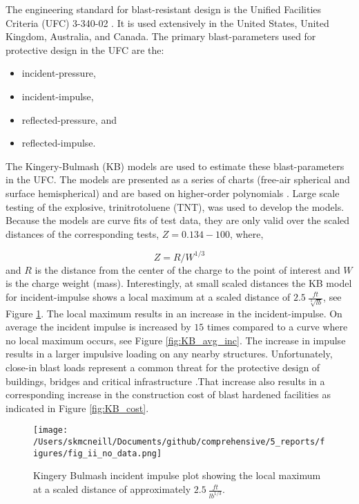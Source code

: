 The engineering standard for blast-resistant design is the Unified Facilities Criteria (UFC) 3-340-02 \cite{UFC3-340-02-2008}.  It is used extensively in the United States, United Kingdom, Australia, and Canada.   The primary blast-parameters used for protective design in the UFC are the:
\begin{itemize}
  \item incident-pressure,
  \item incident-impulse,
  \item reflected-pressure, and
  \item reflected-impulse.
\end{itemize}

The Kingery-Bulmash (KB) models are used to estimate these blast-parameters in the UFC.  The models are presented as a series of charts (free-air spherical and surface hemispherical) and are based on higher-order polynomials \cite{Kingery1984}.  Large scale testing of the explosive, trinitrotoluene (TNT), was used to develop the models.  Because the models are curve fits of test data, they are only valid over the scaled distances of the corresponding tests, $Z = 0.134 - 100$, where, 

$$Z=R/W^{1/3}$$
and $R$ is the distance from the center of the charge to the point of interest and $W$ is the charge weight (mass). Interestingly, at small scaled distances the KB model for incident-impulse shows a local maximum at a scaled distance of $2.5\:\frac{ft}{\sqrt[3]{lb}}$, see Figure \ref{fig:KB_incident_impulse}.  The local maximum results in an increase in the incident-impulse.  On average the incident impulse is increased by $15$ times compared to a curve where no local maximum occurs, see Figure \ref{fig:KB_avg_inc}.  The increase in impulse results in a larger impulsive loading on any nearby structures. Unfortunately, close-in blast loads represent a common threat for the protective design of buildings, bridges and critical infrastructure \cite{Shin2015a}\cite{Shin2014}.That increase also results in a corresponding increase in the construction cost of blast hardened facilities as indicated in Figure \ref{fig:KB_cost}.  

\begin{figure}[tb]
  \begin{center}
   \texttt{[image: /Users/skmcneill/Documents/github/comprehensive/5\_reports/figures/fig\_ii\_no\_data.png]}
  \end{center}
  \caption{Kingery Bulmash incident impulse plot showing the local maximum at a scaled distance of approximately $2.5\:\frac{ft}{lb^{1/3}}$\citep{Kingery1984}.}
\label{fig:KB_incident_impulse}
\end{figure}%

